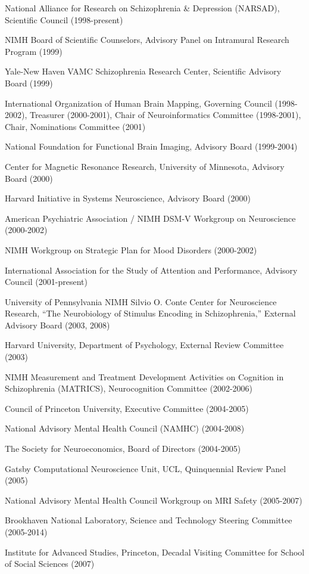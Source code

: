 \documentclass[10 pt]{article}
\begin{document}
National Alliance for Research on Schizophrenia \& Depression (NARSAD), Scientific Council (1998-present)

NIMH Board of Scientific Counselors, Advisory Panel on Intramural Research Program (1999)

Yale-New Haven VAMC Schizophrenia Research Center, Scientific Advisory Board (1999)

International Organization of Human Brain Mapping, Governing Council (1998-2002), Treasurer (2000-2001), Chair of Neuroinformatics Committee (1998-2001), Chair, Nominations Committee (2001)

National Foundation for Functional Brain Imaging, Advisory Board (1999-2004)

Center for Magnetic Resonance Research, University of Minnesota, Advisory Board (2000)

Harvard Initiative in Systems Neuroscience, Advisory Board (2000)

American Psychiatric Association / NIMH DSM-V Workgroup on Neuroscience (2000-2002)

NIMH Workgroup on Strategic Plan for Mood Disorders (2000-2002)

International Association for the Study of Attention and Performance, Advisory Council (2001-present)

University of Pennsylvania NIMH Silvio O. Conte Center for Neuroscience Research, “The Neurobiology of Stimulus Encoding in Schizophrenia,” External Advisory Board (2003, 2008)

Harvard University, Department of Psychology, External Review Committee (2003)

NIMH Measurement and Treatment Development Activities on Cognition in Schizophrenia (MATRICS), Neurocognition Committee (2002-2006)

Council of Princeton University, Executive Committee (2004-2005)

National Advisory Mental Health Council (NAMHC) (2004-2008)

The Society for Neuroeconomics, Board of Directors (2004-2005)

Gatsby Computational Neuroscience Unit, UCL, Quinquennial Review Panel (2005)

National Advisory Mental Health Council Workgroup on MRI Safety (2005-2007)

Brookhaven National Laboratory, Science and Technology Steering Committee (2005-2014)

Institute for Advanced Studies, Princeton, Decadal Visiting Committee for School of Social Sciences (2007)
\end{document}
